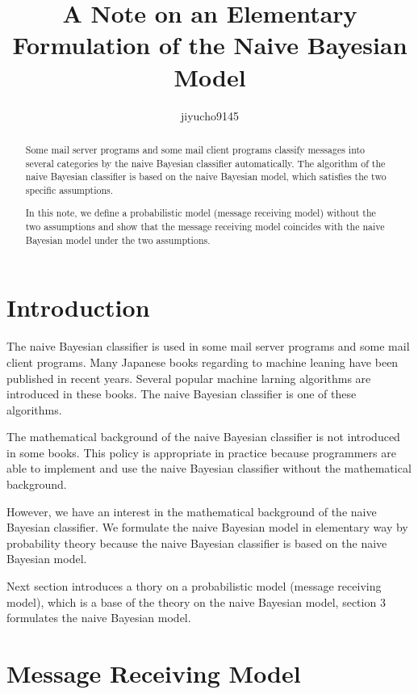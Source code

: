 \documentclass[11pt, a4note]{article}
\theoremstyle{definition}
\begin{document}
\title{A Note on an Elementary Formulation of the Naive Bayesian Model}
\author{jiyucho9145}
\maketitle
\begin{abstract}
Some mail server programs and some mail client programs classify messages into several categories
by the naive Bayesian classifier automatically. The algorithm of the naive Bayesian classifier is based on
the naive Bayesian model, which satisfies the two specific assumptions.

In this note, we define a probabilistic model (message receiving model) without the two assumptions
and show that the message receiving model coincides with the naive Bayesian model under the two assumptions.
\end{abstract}

\newpage
\tableofcontents

\newpage
\section{Introduction}
The naive Bayesian classifier is used in some mail server programs and some mail client programs.
Many Japanese books regarding to machine leaning have been published in recent years.
Several popular machine larning algorithms are introduced in these books.
The naive Bayesian classifier is one of these algorithms.

The mathematical background of the naive Bayesian classifier is not introduced in some books.
This policy is appropriate in practice because programmers are able to implement and use
the naive Bayesian classifier without the mathematical background.

However, we have an interest in the mathematical background of the naive Bayesian classifier. 
We formulate the naive Bayesian model in elementary way by probability theory
because the naive Bayesian classifier is based on the naive Bayesian model.

Next section introduces a thory on a probabilistic model (message receiving model),
which is a base of the theory on the naive Bayesian model, section 3 formulates
the naive Bayesian model.

\section{Message Receiving Model}
\end{document}
